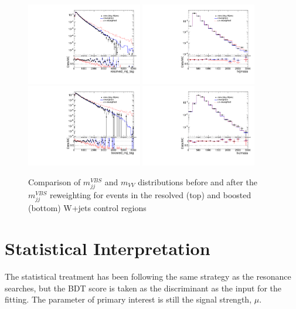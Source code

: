 \begin{figure}[!ht]
	\centering
	\includegraphics[width=0.45\textwidth]{Chapter5/resolved_mjj_tag_sub.pdf}	\includegraphics[width=0.45\textwidth]{Chapter5/lvjjmass_sub.pdf}
	\includegraphics[width=0.45\textwidth]{Chapter5/boosted_mjj_tag_sub.pdf}
	\includegraphics[width=0.45\textwidth]{Chapter5/lvJmass_sub.pdf}
	\caption{\label{Fig:mjjtag_rwt_Wjets}
		Comparison of $m_{jj}^{VBS}$ and $m_{VV}$ distributions before and after the $m_{jj}^{VBS}$ reweighting for events in the resolved (top) and boosted (bottom) W+jets control regions 
	}
\end{figure}
\section{Statistical Interpretation}
The statistical treatment has been following the same strategy as the resonance searches, but the BDT score is taken as the discriminant as the input for the fitting. The parameter of primary interest is still the signal strength, $\mu$.
\\
\\ 